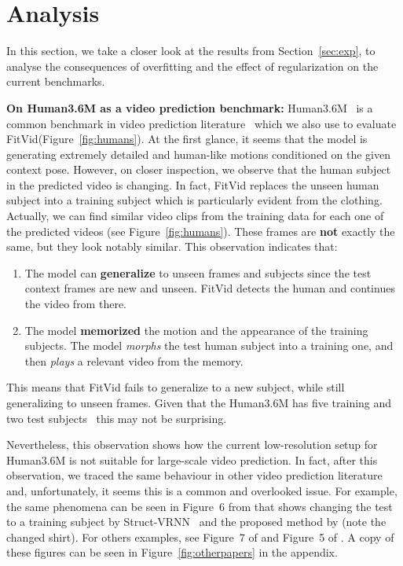 \documentclass{article}
\newcommand{\model}{FitVid\xspace}
\begin{document}
\section{Analysis}
\label{sec:analysis}


In this section, we take a closer look at the results from Section~\ref{sec:exp}, to analyse the consequences of overfitting and the effect of regularization on the current benchmarks.

\textbf{On Human3.6M as a video prediction benchmark:}
Human3.6M~\cite{ionescu2014human3} is a 
common benchmark in video prediction literature~\cite{finn2016unsupervised, babaeizadeh2017stochastic,villegas2017learning,wang2019memory,villegas2019high,lin2020motion,franceschi2020stochastic,guen2020disentangling,wu2021greedy,wu2021motionrnn} which we also use to evaluate \model (Figure~\ref{fig:humans}). At the first glance, it seems that the model is generating extremely detailed and human-like motions conditioned on the given context pose. However, on closer inspection, we observe that the human subject in the predicted video is changing. In fact, \model replaces the unseen human subject into a training subject which is particularly evident from the clothing. Actually, we can find similar video clips from the training data for each one of the predicted videos (see Figure~\ref{fig:humans}). These frames are \textbf{not} exactly the same, but they look notably similar. This observation indicates that:
\begin{enumerate}[leftmargin=0.55cm,noitemsep,topsep=0pt]
    \item The model can \textbf{generalize} to unseen frames and subjects since the test context frames are new and unseen. \model detects the human and continues the video from there.
    \item The model \textbf{memorized} the motion and the appearance of the training subjects. 
    The model \textit{morphs} the test human subject into a training one, and then \textit{plays} a relevant video from the memory. 
\end{enumerate}
This means that \model fails to generalize to a new subject, while still generalizing to unseen frames. Given that the Human3.6M has five training and two test subjects~\cite{finn2016unsupervised,villegas2017learning} this may not be surprising. 

Nevertheless, this observation shows how the current low-resolution setup for Human3.6M is not suitable for large-scale video prediction. In fact, after this observation, we traced the same behaviour in other video prediction literature and, unfortunately, it seems this is a common and overlooked issue. For example, the same phenomena can be seen in Figure~6 from \citet{franceschi2020stochastic} that shows changing the test to a training subject by Struct-VRNN~\cite{minderer2019unsupervised} and the proposed method by \citet{franceschi2020stochastic} (note the changed shirt). For others examples, see Figure~7 of \citet{villegas2019high} and Figure~5 of \citet{villegas2017learning}. A copy of these figures can be seen in Figure~\ref{fig:otherpapers} in the appendix.
\end{document}
